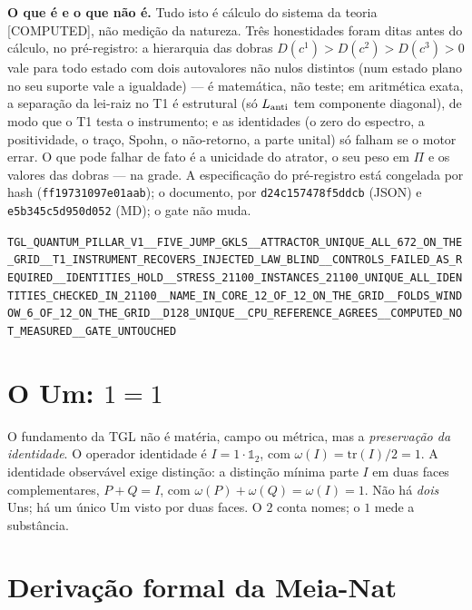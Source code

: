 \documentclass[11pt]{article}
\theoremstyle{definition}\newtheorem{deriv}{Derivação}
\begin{document}
\textbf{O que é e o que não é.} Tudo isto é cálculo do sistema da teoria \textsf{[COMPUTED]}, não medição da natureza. Três honestidades foram ditas antes do cálculo, no pré-registro: a hierarquia das dobras $D(c^1)>D(c^2)>D(c^3)>0$ vale para todo estado com dois autovalores não nulos distintos (num estado plano no seu suporte vale a igualdade) --- é matemática, não teste; em aritmética exata, a separação da lei-raiz no T1 é estrutural (só $L_{\rm anti}$ tem componente diagonal), de modo que o T1 testa o instrumento; e as identidades (o zero do espectro, a positividade, o traço, Spohn, o não-retorno, a parte unital) só falham se o motor errar. O que pode falhar de fato é a unicidade do atrator, o seu peso em $\Pi$ e os valores das dobras --- na grade. A especificação do pré-registro está congelada por hash (\texttt{ff19731097e01aab}); o documento, por \texttt{d24c157478f5ddcb} (JSON) e \texttt{e5b345c5d950d052} (MD); o gate não muda.

\begin{center}\small\texttt{TGL\_QUANTUM\_PILLAR\_V1\_\_FIVE\_JUMP\_GKLS\_\_ATTRACTOR\_UNIQUE\_ALL\_672\_ON\_THE\_GRID\_\_T1\_INSTRUMENT\_RECOVERS\_INJECTED\_LAW\_BLIND\_\_CONTROLS\_FAILED\_AS\_REQUIRED\_\_IDENTITIES\_HOLD\_\_STRESS\_21100\_INSTANCES\_21100\_UNIQUE\_ALL\_IDENTITIES\_CHECKED\_IN\_21100\_\_NAME\_IN\_CORE\_12\_OF\_12\_ON\_THE\_GRID\_\_FOLDS\_WINDOW\_6\_OF\_12\_ON\_THE\_GRID\_\_D128\_UNIQUE\_\_CPU\_REFERENCE\_AGREES\_\_COMPUTED\_NOT\_MEASURED\_\_GATE\_UNTOUCHED}\end{center}

\section{O Um: $1=1$}

O fundamento da TGL não é matéria, campo ou métrica, mas a \emph{preservação da identidade}. O operador identidade é $I=1\cdot\mathbb{1}_2$, com $\omega(I)=\mathrm{tr}(I)/2=1$. A identidade observável exige distinção: a distinção mínima parte $I$ em duas faces complementares, $P+Q=I$, com $\omega(P)+\omega(Q)=\omega(I)=1$. Não há \emph{dois} Uns; há um único Um visto por duas faces. O $2$ conta nomes; o $1$ mede a substância.

\section{Derivação formal da Meia-Nat}
\end{document}
